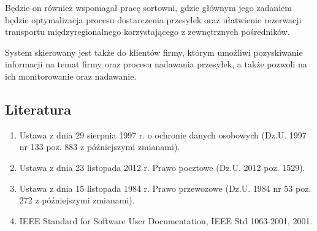 Będzie on również wspomagał pracę sortowni, gdzie głównym jego zadaniem będzie optymalizacja procesu dostarczenia przesyłek oraz ułatwienie rezerwacji transportu międzyregionalnego korzystającego z zewnętrznych pośredników.

System skierowany jest także do klientów firmy, którym umożliwi pozyskiwanie informacji na temat firmy oraz procesu nadawania przesyłek, a także pozwoli na ich monitorowanie oraz nadawanie.

%



\subsection{Literatura}
\label{subsec:Literatura}
\begin{enumerate}
\item Ustawa z dnia 29 sierpnia 1997 r. o ochronie danych osobowych (Dz.U. 1997 nr 133 poz. 883 z późniejszymi zmianami).
\item Ustawa z dnia 23 listopada 2012 r. Prawo pocztowe (Dz.U. 2012 poz. 1529).
\item Ustawa z dnia 15 listopada 1984 r. Prawo przewozowe (Dz.U. 1984 nr 53 poz. 272 z późniejszymi zmianami).
\item IEEE Standard for Software User Documentation, IEEE Std 1063-2001, 2001.
\end{enumerate}